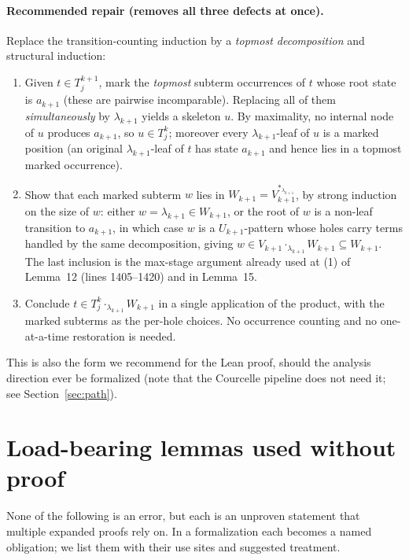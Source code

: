 \documentclass[11pt]{article}
\begin{document}
\paragraph{Recommended repair (removes all three defects at once).}
Replace the transition-counting induction by a \emph{topmost decomposition}
and structural induction:
\begin{enumerate}[leftmargin=*]
  \item Given \(t\in T_j^{k+1}\), mark the \emph{topmost} subterm occurrences
    of \(t\) whose root state is \(a_{k+1}\) (these are pairwise incomparable).
    Replacing all of them \emph{simultaneously} by \(\lambda_{k+1}\) yields a
    skeleton \(u\).  By maximality, no internal node of \(u\) produces
    \(a_{k+1}\), so \(u\in T_j^k\); moreover every
    \(\lambda_{k+1}\)-leaf of \(u\) is a marked position (an original
    \(\lambda_{k+1}\)-leaf of \(t\) has state \(a_{k+1}\) and hence lies in a
    topmost marked occurrence).
  \item Show that each marked subterm \(w\) lies in
    \(W_{k+1}=V_{k+1}^{*_{\lambda_{k+1}}}\), by strong induction on the size of
    \(w\): either \(w=\lambda_{k+1}\in W_{k+1}\), or the root of \(w\) is a
    non-leaf transition to \(a_{k+1}\), in which case \(w\) is a
    \(U_{k+1}\)-pattern whose holes carry terms handled by the same
    decomposition, giving \(w\in V_{k+1}\cdot_{\lambda_{k+1}}W_{k+1}\subseteq
    W_{k+1}\).  The last inclusion is the max-stage argument already used at
    (1) of Lemma~12 (lines 1405--1420) and in Lemma~15.
  \item Conclude \(t\in T_j^k\cdot_{\lambda_{k+1}}W_{k+1}\) in a single
    application of the product, with the marked subterms as the per-hole
    choices.  No occurrence counting and no one-at-a-time restoration is
    needed.
\end{enumerate}
This is also the form we recommend for the Lean proof, should the analysis
direction ever be formalized (note that the Courcelle pipeline does not need
it; see Section~\ref{sec:path}).

\section{Load-bearing lemmas used without proof}
\label{sec:obligations}

None of the following is an error, but each is an unproven statement that
multiple expanded proofs rely on.  In a formalization each becomes a named
obligation; we list them with their use sites and suggested treatment.
\end{document}
